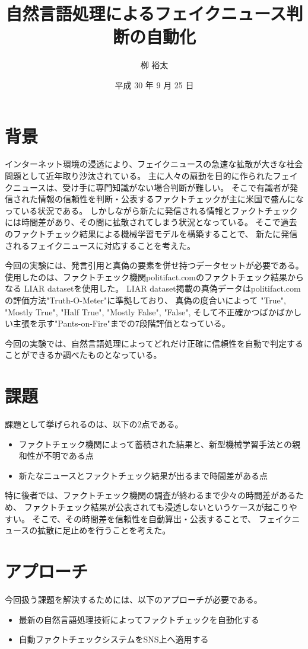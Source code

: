\documentclass[twocolumn, a4paper, uplatex]{UECIEresume}
\title{自然言語処理によるフェイクニュース判断の自動化}
\date{平成 30 年 9 月 25 日}
\affiliation{総合情報学科 メディア情報学 コース}
\author{栁 裕太}
\begin{document}
\maketitle

\section{背景}
インターネット環境の浸透により、フェイクニュースの急速な拡散が大きな社会問題として近年取り沙汰されている。
主に人々の扇動を目的に作られたフェイクニュースは、受け手に専門知識がない場合判断が難しい。
そこで有識者が発信された情報の信頼性を判断・公表するファクトチェックが主に米国で盛んになっている状況である。
しかしながら新たに発信される情報とファクトチェックには時間差があり、その間に拡散されてしまう状況となっている。
そこで過去のファクトチェック結果による機械学習モデルを構築することで、
新たに発信されるフェイクニュースに対応することを考えた。

今回の実験には、発言引用と真偽の要素を併せ持つデータセットが必要である。
使用したのは、ファクトチェック機関politifact.comのファクトチェック結果からなる
LIAR datasetを使用した\cite{pants}。
LIAR dataset掲載の真偽データはpolitifact.comの評価方法"Truth-O-Meter"に準拠\cite{truth}しており、
真偽の度合いによって
"True", "Mostly True", "Half True", "Mostly False", "False",
そして不正確かつばかばかしい主張を示す"Pants-on-Fire"までの7段階評価となっている\cite{pants}。

今回の実験では、自然言語処理によってどれだけ正確に信頼性を自動で判定することができるか調べたものとなっている。

\section{課題}
課題として挙げられるのは、以下の2点である。
\begin{itemize}
  \item ファクトチェック機関によって蓄積された結果と、新型機械学習手法との親和性が不明である点
  \item 新たなニュースとファクトチェック結果が出るまで時間差がある点
\end{itemize}
特に後者では、ファクトチェック機関の調査が終わるまで少々の時間差があるため、
ファクトチェック結果が公表されても浸透しないというケースが起こりやすい。
そこで、その時間差を信頼性を自動算出・公表することで、
フェイクニュースの拡散に足止めを行うことを考えた。

\section{アプローチ}
今回扱う課題を解決するためには、以下のアプローチが必要である。
\begin{itemize}
  \item 最新の自然言語処理技術によってファクトチェックを自動化する
  \item 自動ファクトチェックシステムをSNS上へ適用する
\end{itemize}
\end{document}

